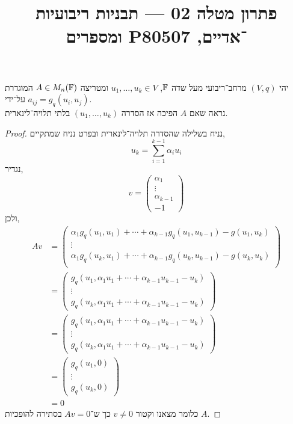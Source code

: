 
\title{פתרון מטלה 02 --- תבניות ריבועיות ומספרים P־אדיים, 80507}

\DeclareMathOperator{\rank}{rank}



\maketitle
\maketitleprint[red]

\question{}
יהי $(V, q)$ מרחב־ריבועי מעל שדה $\mathbb{F}$, $u_1, \ldots, u_k \in V$ ומטריצה $A \in M_n(\mathbb{F})$ המוגדרת על־ידי $a_{ij} = g_q(u_i, u_j)$. \\
נראה שאם $A$ הפיכה אז הסדרה $(u_1, \ldots, u_k)$ בלתי תלויה־לינארית.
\begin{proof}
	נניח בשלילה שהסדרה תלויה־לינארית ובפרט נניח שמתקיים,
	\[
		u_k
		= \sum_{i = 1}^{k - 1} \alpha_i u_i
	\]
	נגדיר,
	\[
		v
		= \begin{pmatrix} \alpha_1 \\ \vdots \\ \alpha_{k - 1} \\ -1 \end{pmatrix} 
	\]
	ולכן,
	\begin{align*}
		A v
		& = \begin{pmatrix}
			\alpha_1 g_q(u_1, u_1) + \cdots + \alpha_{k - 1} g_q(u_1, u_{k - 1}) - g(u_1, u_k) \\
			\vdots \\
			\alpha_1 g_q(u_k, u_1) + \cdots + \alpha_{k - 1} g_q(u_k, u_{k - 1}) - g(u_k, u_k) \\
		\end{pmatrix} \\
		& = \begin{pmatrix}
			g_q(u_1, \alpha_1 u_1 + \cdots + \alpha_{k - 1} u_{k - 1} - u_k) \\
			\vdots \\
			g_q(u_k, \alpha_1 u_1 + \cdots + \alpha_{k - 1} u_{k - 1} - u_k)
		\end{pmatrix} \\
		& = \begin{pmatrix}
			g_q(u_1, \alpha_1 u_1 + \cdots + \alpha_{k - 1} u_{k - 1} - u_k) \\
			\vdots \\
			g_q(u_k, \alpha_1 u_1 + \cdots + \alpha_{k - 1} u_{k - 1} - u_k)
		\end{pmatrix} \\
		& = \begin{pmatrix}
			g_q(u_1, 0) \\
			\vdots \\
			g_q(u_k, 0)
		\end{pmatrix} \\
		& = 0
	\end{align*}
	כלומר מצאנו וקטור $v \ne 0$ כך ש־$A v = 0$ בסתירה להופכיות $A$.
\end{proof}

